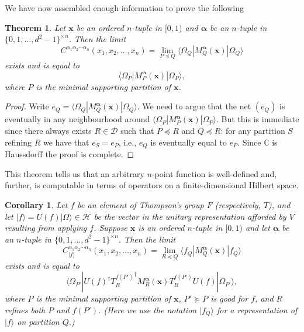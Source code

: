 \documentclass[11pt,oneside]{amsart}
\theoremstyle{plain}%
\newtheorem{theorem}{Theorem}[section]
\newtheorem*{corollary}{Corollary}
\theoremstyle{definition}
\theoremstyle{remark}
\begin{document}
We have now assembled enough information to prove the following
\begin{theorem}\label{thm:npt}
	Let $\mathbf{x}$ be an ordered $n$-tuple in $[0,1)$ and $\boldsymbol{\alpha}$ be an $n$-tuple in $\{0,1,\ldots,d^2-1\}^{\times n}$. Then the limit 
	\begin{equation}
		C^{\alpha_1\alpha_2\cdots\alpha_n}(x_1, x_2, \ldots, x_n) = \lim_{P\preceq Q} \langle \Omega_Q|M^{\boldsymbol{\alpha}}_Q(\mathbf{x})|\Omega_Q\rangle
	\end{equation}
	exists and is equal to
	\begin{equation}
		\langle \Omega_P|M^{\boldsymbol{\alpha}}_P(\mathbf{x})|\Omega_P\rangle,
	\end{equation}
	where $P$ is the minimal supporting partition of $\mathbf{x}$.
\end{theorem}
\begin{proof}
	Write $e_Q = \langle \Omega_Q|M^{\boldsymbol{\alpha}}_Q(\mathbf{x})|\Omega_Q\rangle$. We need to argue that the net $(e_Q)$ is eventually in any neighbourhood around $\langle \Omega_P|M^{\boldsymbol{\alpha}}_P(\mathbf{x})|\Omega_P\rangle$. But this is immediate since there always exists $R\in\mathcal{D}$ such that $P\preceq R$ and $Q\preceq R$: for any partition $S$ refining $R$ we have that $e_S = e_P$, i.e., $e_Q$ is eventually equal to $e_P$. Since $\mathbb{C}$ is Haussdorff the proof is complete.
\end{proof}

	This theorem tells us that an arbitrary $n$-point function is well-defined and, further, is computable in terms of operators on a finite-dimensional Hilbert space.

\begin{corollary}
	Let $f$ be an element of Thompson's group $F$ (respectively, $T$), and let $|f\rangle = U(f)|\Omega\rangle \in \mathcal{H}$ be the vector in the unitary representation afforded by $V$ resulting from applying $f$. Suppose $\mathbf{x}$ is an ordered $n$-tuple in $[0,1)$ and let $\boldsymbol{\alpha}$ be an $n$-tuple in $\{0,1,\ldots,d^2-1\}^{\times n}$. Then the limit
	\begin{equation}
		C^{\alpha_1\alpha_2\cdots\alpha_n}_{|f\rangle}(x_1, x_2, \ldots, x_n) = \lim_{R\preceq Q} \langle f_Q|M^{\boldsymbol{\alpha}}_Q(\mathbf{x})|f_Q\rangle
	\end{equation}
	exists and is equal to
	\begin{equation}
		\langle \Omega_{P'}|U(f)^\dag {T^{f(P')}_R}^\dag M^{\boldsymbol{\alpha}}_R(\mathbf{x})T^{f(P')}_R U(f)|\Omega_{P'}\rangle,
	\end{equation}
	where $P$ is the minimal supporting partition of $\mathbf{x}$, $P'\succeq P$ is good for $f$, and $R$ refines both $P$ and $f(P')$. (Here we use the notation $|f_Q\rangle$ for a representation of $|f\rangle$ on partition $Q$.)
\end{corollary}
\end{document}
